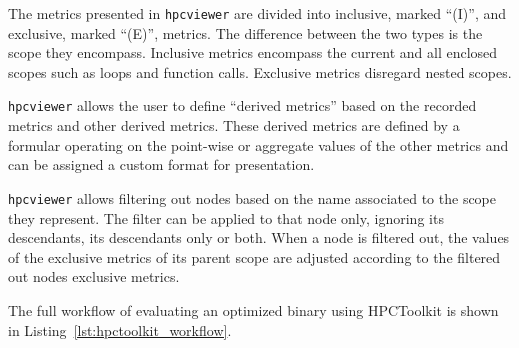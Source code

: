 \documentclass[a4paper, 11pt]{memoir}
\begin{document}
    The metrics presented in \texttt{hpcviewer} are divided into inclusive, marked \enquote{(I)}, and exclusive,
    marked \enquote{(E)}, metrics. The difference between the two types is the scope they encompass. Inclusive metrics
    encompass the current and all enclosed scopes such as loops and function calls. Exclusive metrics disregard nested
    scopes.

    \texttt{hpcviewer} allows the user to define \enquote{derived metrics} based on the recorded metrics and other
    derived metrics. These derived metrics are defined by a formular operating on the point-wise or aggregate values of
    the other metrics and can be assigned a custom format for presentation.

    \texttt{hpcviewer} allows filtering out nodes based on the name associated to the scope they represent. The
    filter can be applied to that node only, ignoring its descendants, its descendants only or both. When a node is filtered
    out, the values of the exclusive metrics of its parent scope are adjusted according to the filtered out nodes exclusive
    metrics.

    The full workflow of evaluating an optimized binary using HPCToolkit is shown in Listing~\ref{lst:hpctoolkit_workflow}.

    \backmatter
    \printglossaries
    \printbibliography[heading=bibintoc]
\end{document}
